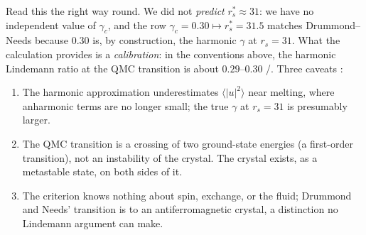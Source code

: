 Read this the right way round. We did not \emph{predict} $r_s^\ast\approx31$: we have no independent value of
$\gamma_c$, and the row $\gamma_c=0.30\mapsto r_s^\ast=31.5$ matches Drummond--Needs because $0.30$ is, by construction,
the harmonic $\gamma$ at $r_s=31$. What the calculation provides is a \emph{calibration}: in the conventions above,
the harmonic Lindemann ratio at the QMC transition is about $0.29$--$0.30$ \tierX/\tierC. Three caveats \tierC:
\begin{enumerate}
\item The harmonic approximation underestimates $\langle|u|^2\rangle$ near melting, where anharmonic terms are no
longer small; the true $\gamma$ at $r_s=31$ is presumably larger.
\item The QMC transition is a crossing of two ground-state energies (a first-order transition), not an instability of
the crystal. The crystal exists, as a metastable state, on both sides of it.
\item The criterion knows nothing about spin, exchange, or the fluid; Drummond and Needs' transition is to an
antiferromagnetic crystal, a distinction no Lindemann argument can make.
\end{enumerate}

